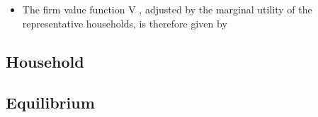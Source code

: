 \documentclass[a4paper,10pt]{article}  %
\begin{document}
\begin{itemize}
   \item The firm value function V , adjusted by the marginal utility of the representative households, is therefore given by
\end{itemize}

\subsection{Household} %
\label{sub:household}




\subsection{Equilibrium} %
\label{sub:equilibrium}
\end{document}
